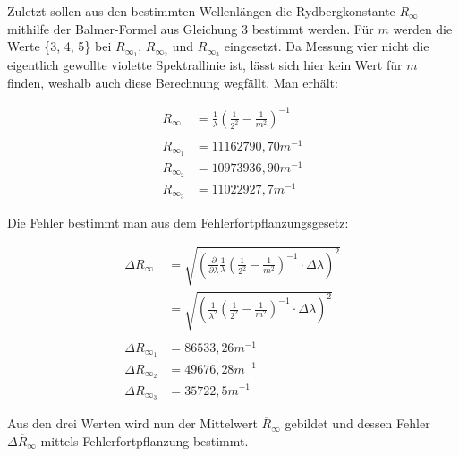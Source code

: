 \documentclass{article}
\begin{document}
Zuletzt sollen aus den bestimmten Wellenlängen die Rydbergkonstante $R_{\infty}$ mithilfe der Balmer-Formel aus Gleichung 3 bestimmt werden. Für $m$ werden die Werte \{3, 4, 5\} bei $R_{\infty_{1}}$, $R_{\infty_{2}}$ und $R_{\infty_{3}}$ eingesetzt. Da Messung vier nicht die eigentlich gewollte violette Spektrallinie ist, lässt sich hier kein Wert für $m$ finden, weshalb auch diese Berechnung wegfällt. Man erhält:

\begin{equation}
    \begin{split}
        R_{\infty} &= \frac{1}{\lambda} \left( \frac{1}{2^2} - \frac{1}{m^2} \right)^{-1} \\ \\
        R_{\infty_{1}} &= 11162790,70 m^{-1} \\
        R_{\infty_{2}} &= 10973936,90 m^{-1} \\
        R_{\infty_{3}} &= 11022927,7 m^{-1}
    \end{split}
\end{equation}

Die Fehler bestimmt man aus dem Fehlerfortpflanzungsgesetz:

\begin{equation}
    \begin{split}
        \Delta R_{\infty} &= \sqrt{\left( \frac{\partial}{\partial \lambda} \frac{1}{\lambda} \left( \frac{1}{2^2} - \frac{1}{m^2} \right)^{-1} \cdot \Delta \lambda \right)^2} \\ 
        &= \sqrt{\left( \frac{1}{\lambda^2} \left( \frac{1}{2^2} - \frac{1}{m^2} \right)^{-1} \cdot \Delta \lambda \right)^2} \\ \\
        \Delta R_{\infty_{1}} &= 86533,26 m^{-1} \\
        \Delta R_{\infty_{2}} &= 49676,28 m^{-1} \\
        \Delta R_{\infty_{3}} &= 35722,5 m^{-1}
    \end{split}
\end{equation}

Aus den drei Werten wird nun der Mittelwert $\overline{R}_{\infty}$ gebildet und dessen Fehler $\Delta \overline{R}_{\infty}$ mittels Fehlerfortpflanzung bestimmt.

\end{document}
